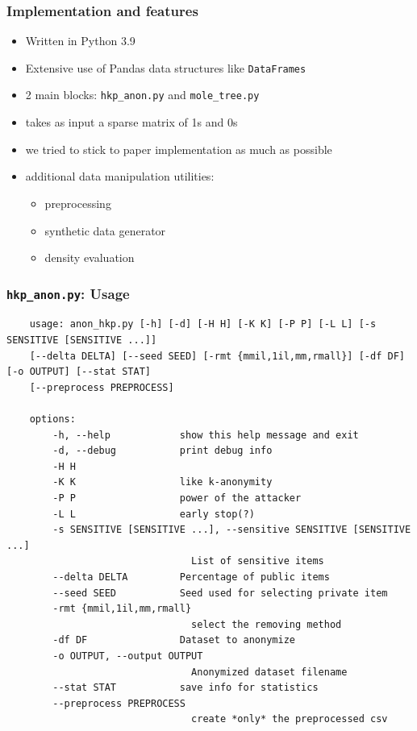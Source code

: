 \documentclass{beamer}
\begin{document}
\begin{frame}[fragile]
\frametitle{Implementation and features}
    \begin{itemize}
        \item Written in Python 3.9
        \item Extensive use of Pandas data structures like \texttt{DataFrames}
        \item 2 main blocks: \verb!hkp_anon.py! and \verb!mole_tree.py!
        \item takes as input a sparse matrix of 1s and 0s
        \item we tried to stick to paper implementation as much as possible
        \item additional data manipulation utilities:
        \begin{itemize}
            \item preprocessing
            \item synthetic data generator
            \item density evaluation
        \end{itemize}
    \end{itemize}
    
\end{frame}
\begin{frame}[fragile]
\frametitle{\texttt{hkp\_anon.py}: Usage}
    \begin{tiny}
    \begin{verbatim}
    usage: anon_hkp.py [-h] [-d] [-H H] [-K K] [-P P] [-L L] [-s SENSITIVE [SENSITIVE ...]] 
    [--delta DELTA] [--seed SEED] [-rmt {mmil,1il,mm,rmall}] [-df DF] [-o OUTPUT] [--stat STAT] 
    [--preprocess PREPROCESS]

    options:
        -h, --help            show this help message and exit
        -d, --debug           print debug info
        -H H
        -K K                  like k-anonymity
        -P P                  power of the attacker
        -L L                  early stop(?)
        -s SENSITIVE [SENSITIVE ...], --sensitive SENSITIVE [SENSITIVE ...]
                                List of sensitive items
        --delta DELTA         Percentage of public items
        --seed SEED           Seed used for selecting private item
        -rmt {mmil,1il,mm,rmall}
                                select the removing method
        -df DF                Dataset to anonymize
        -o OUTPUT, --output OUTPUT
                                Anonymized dataset filename
        --stat STAT           save info for statistics
        --preprocess PREPROCESS
                                create *only* the preprocessed csv
    \end{verbatim}
    \end{tiny}
\end{frame}
\end{document}

